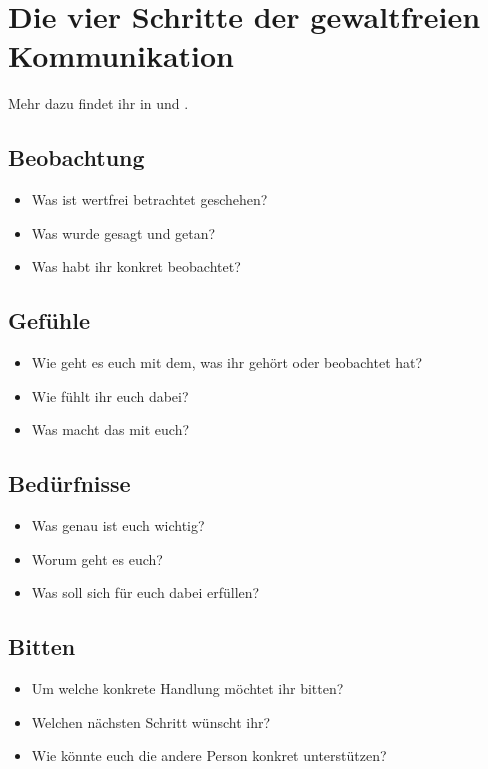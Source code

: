 \section{Die vier Schritte der gewaltfreien Kommunikation}

Mehr dazu findet ihr in \cite[S. 213]{gfk-rosenberg} und \cite{gfk-dummies}.

\subsection{Beobachtung}

\begin{itemize}
 \item Was ist wertfrei betrachtet geschehen?
 \item Was wurde gesagt und getan?
 \item Was habt ihr konkret beobachtet?
\end{itemize}


\subsection{Gefühle}

\begin{itemize}
 \item Wie geht es euch mit dem, was ihr gehört oder beobachtet hat?
 \item Wie fühlt ihr euch dabei?
 \item Was macht das mit euch?
\end{itemize}


\subsection{Bedürfnisse}

\begin{itemize}
 \item Was genau ist euch wichtig?
 \item Worum geht es euch?
 \item Was soll sich für euch dabei erfüllen?
\end{itemize}


\subsection{Bitten}

\begin{itemize}
 \item Um welche konkrete Handlung möchtet ihr bitten?
 \item Welchen nächsten Schritt wünscht ihr?
 \item Wie könnte euch die andere Person konkret unterstützen?
\end{itemize}
